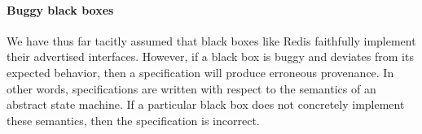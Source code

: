 

\paragraph{Buggy black boxes}
We have thus far tacitly assumed that black boxes like Redis faithfully
implement their advertised interfaces. However, if a black box is buggy and
deviates from its expected behavior, then a \watprovenance{} specification will
produce erroneous provenance. In other words, \watprovenance{} specifications
are written with respect to the semantics of an abstract state machine. If a
particular black box does not concretely implement these semantics, then the
\watprovenance{} specification is incorrect.

